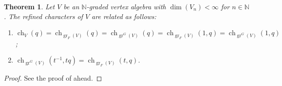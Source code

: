 \documentclass[a4paper, 12pt, reqno]{amsart}
\newtheorem{theorem}{Theorem}[section]
\theoremstyle{remark}
\DeclareMathOperator{\gr}{gr}
\DeclareMathOperator{\ch}{ch}
\begin{document}
\begin{theorem}
  \label{thr:53}
  Let $V$ be an $\mathbb{N}$-graded vertex algebra with $\dim(V_n) < \infty$ for $n \in \mathbb{N}$.
  The refined characters of $V$ are related as follows:
  \begin{enumerate}
  \item $\ch_V(q) = \ch_{\gr_F(V)}(q) = \ch_{\gr^G(V)}(q) = \ch_{\gr_F(V)}(1, q) = \ch_{\gr^G(V)}(1, q)$;
  \item $\ch_{\gr^G(V)}(t^{-1}, tq) = \ch_{\gr_F(V)}(t, q)$.
  \end{enumerate}
\end{theorem}

\begin{proof}
  See the proof of  ahead.
\end{proof}
\end{document}
